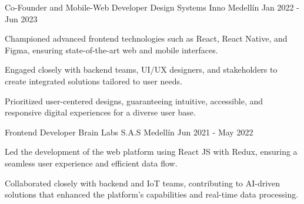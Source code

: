 \begin{cventries}
{\begin{cvitems}
  \end{cvitems}
}
\cventry
{Co-Founder and Mobile-Web Developer} %
{Design Systems Inno} %
{Medellín} %
{Jan 2022 - Jun 2023} %
{
  \begin{cvitems} %
    \item {Championed advanced frontend technologies such as React, React Native, and Figma, ensuring state-of-the-art web and mobile interfaces.}
    \item {Engaged closely with backend teams, UI/UX designers, and stakeholders to create integrated solutions tailored to user needs.}
    \item {Prioritized user-centered designs, guaranteeing intuitive, accessible, and responsive digital experiences for a diverse user base.}
  \end{cvitems}
}
\cventry
{Frontend Developer} %
{Brain Labs S.A.S} %
{Medellín} %
{Jun 2021 - May 2022} %
{
  \begin{cvitems} %
    \item {Led the development of the web platform using React JS with Redux, ensuring a seamless user experience and efficient data flow.}
    \item {Collaborated closely with backend and IoT teams, contributing to AI-driven solutions that enhanced the platform's capabilities and real-time data processing.}
  \end{cvitems}
}
\end{cventries}